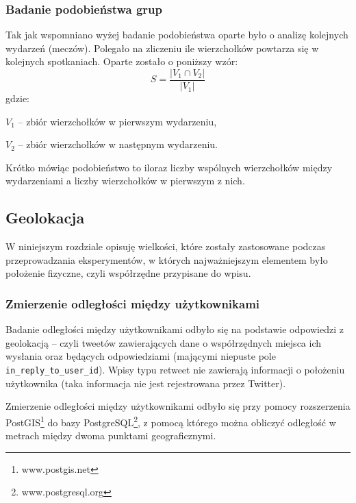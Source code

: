 \subsubsection{Badanie podobieństwa grup}
\label{subsection:badaniepodobienstwagrup}
Tak jak wspomniano wyżej badanie podobieństwa oparte było o analizę kolejnych
wydarzeń (meczów).
Polegało na zliczeniu ile wierzchołków powtarza się w kolejnych spotkaniach.
Oparte zostało o poniższy wzór:
\begin{equation}
S = \frac{|V_1 \cap V_2|}{|V_1|}
\end{equation}  
gdzie:

$V_1$ -- zbiór wierzchołków w pierwszym wydarzeniu,

$V_2$ -- zbiór wierzchołków w następnym wydarzeniu.

Krótko mówiąc podobieństwo to iloraz liczby wspólnych wierzchołków między 
wydarzeniami a liczby wierzchołków w pierwszym z nich.







\subsection{Geolokacja}
W niniejszym rozdziale opisuję wielkości, które zostały zastosowane podczas
przeprowadzania eksperymentów, w których najważniejszym elementem było położenie
fizyczne, czyli współrzędne przypisane do wpisu.

\subsubsection{Zmierzenie odległości między użytkownikami}
\label{subsubsection:zmierzenieodleglosci}


Badanie odległości między użytkownikami odbyło się na podstawie odpowiedzi z
geolokacją -- czyli tweetów zawierających dane o współrzędnych miejsca ich
wysłania oraz będących odpowiedziami (mającymi niepuste pole
\texttt{in\_reply\_to\_user\_id}). Wpisy typu retweet nie zawierają informacji
o położeniu użytkownika (taka informacja nie jest rejestrowana przez Twitter).

Zmierzenie odległości między użytkownikami odbyło się przy pomocy rozszerzenia
PostGIS\footnote{www.postgis.net} do bazy
PostgreSQL\footnote{www.postgresql.org}, z pomocą którego można obliczyć
odległość w metrach między dwoma punktami geograficznymi.

